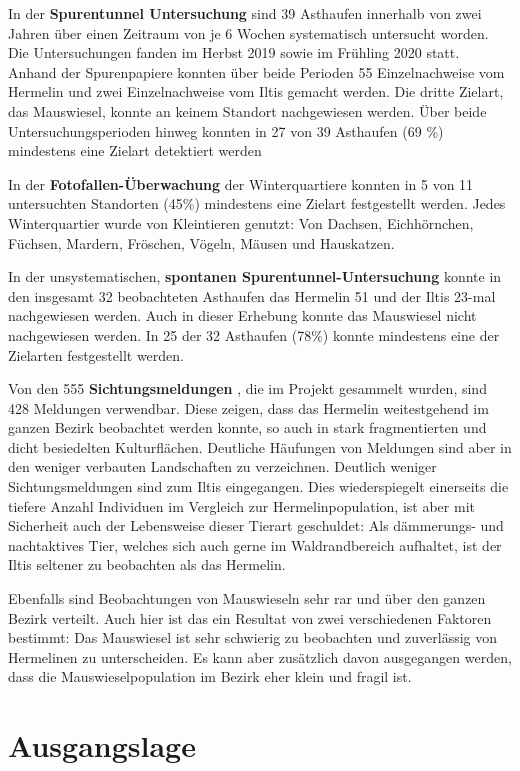 \documentclass[
  oneside]{scrbook}
\begin{document}
In der \textbf{Spurentunnel Untersuchung} sind 39 Asthaufen innerhalb von zwei Jahren über einen Zeitraum von je 6 Wochen systematisch untersucht worden. Die Untersuchungen fanden im Herbst 2019 sowie im Frühling 2020 statt. Anhand der Spurenpapiere konnten über beide Perioden 55 Einzelnachweise vom Hermelin und zwei Einzelnachweise vom Iltis gemacht werden. Die dritte Zielart, das Mauswiesel, konnte an keinem Standort nachgewiesen werden. Über beide Untersuchungsperioden hinweg konnten in 27 von 39 Asthaufen (69 \%) mindestens eine Zielart detektiert werden

In der \textbf{Fotofallen-Überwachung} der Winterquartiere konnten in 5 von 11 untersuchten Standorten (45\%) mindestens eine Zielart festgestellt werden. Jedes Winterquartier wurde von Kleintieren genutzt: Von Dachsen, Eichhörnchen, Füchsen, Mardern, Fröschen, Vögeln, Mäusen und Hauskatzen.

In der unsystematischen, \textbf{spontanen Spurentunnel-Untersuchung} konnte in den insgesamt 32 beobachteten Asthaufen das Hermelin 51 und der Iltis 23-mal nachgewiesen werden. Auch in dieser Erhebung konnte das Mauswiesel nicht nachgewiesen werden. In 25 der 32 Asthaufen (78\%) konnte mindestens eine der Zielarten festgestellt werden.

Von den 555 \textbf{Sichtungsmeldungen} , die im Projekt gesammelt wurden, sind 428 Meldungen verwendbar. Diese zeigen, dass das Hermelin weitestgehend im ganzen Bezirk beobachtet werden konnte, so auch in stark fragmentierten und dicht besiedelten Kulturflächen. Deutliche Häufungen von Meldungen sind aber in den weniger verbauten Landschaften zu verzeichnen. Deutlich weniger Sichtungsmeldungen sind zum Iltis eingegangen. Dies wiederspiegelt einerseits die tiefere Anzahl Individuen im Vergleich zur Hermelinpopulation, ist aber mit Sicherheit auch der Lebensweise dieser Tierart geschuldet: Als dämmerungs- und nachtaktives Tier, welches sich auch gerne im Waldrandbereich aufhaltet, ist der Iltis seltener zu beobachten als das Hermelin.

Ebenfalls sind Beobachtungen von Mauswieseln sehr rar und über den ganzen Bezirk verteilt. Auch hier ist das ein Resultat von zwei verschiedenen Faktoren bestimmt: Das Mauswiesel ist sehr schwierig zu beobachten und zuverlässig von Hermelinen zu unterscheiden. Es kann aber zusätzlich davon ausgegangen werden, dass die Mauswieselpopulation im Bezirk eher klein und fragil ist.

\hypertarget{ausgangslage}{%
\chapter{Ausgangslage}\label{ausgangslage}}
\end{document}
